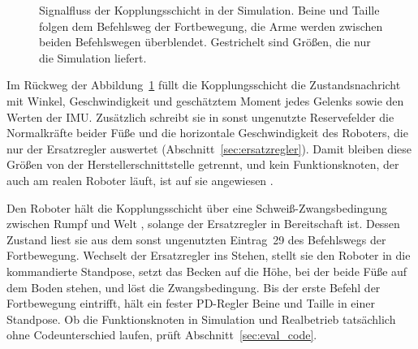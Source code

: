 \begin{figure}[htbp]
  \centering
  
  \caption[Signalfluss der Kopplungsschicht]{Signalfluss der Kopplungsschicht in der Simulation. Beine und Taille folgen dem Befehlsweg der Fortbewegung, die Arme werden zwischen beiden Befehlswegen überblendet. Gestrichelt sind Größen, die nur die Simulation liefert.}
  \label{fig:bridge}
\end{figure}

Im Rückweg der Abbildung~\ref{fig:bridge} füllt die Kopplungsschicht die Zustandsnachricht mit Winkel, Geschwindigkeit und geschätztem Moment jedes Gelenks sowie den Werten der IMU.
Zusätzlich schreibt sie in sonst ungenutzte Reservefelder die Normalkräfte beider Füße und die horizontale Geschwindigkeit des Roboters, die nur der Ersatzregler auswertet (Abschnitt~\ref{sec:ersatzregler}).
Damit bleiben diese Größen von der Herstellerschnittstelle getrennt, und kein Funktionsknoten, der auch am realen Roboter läuft, ist auf sie angewiesen .

Den Roboter hält die Kopplungsschicht über eine Schweiß-Zwangsbedingung zwischen Rumpf und Welt \cite{MujocoDoku2026}, solange der Ersatzregler in Bereitschaft ist.
Dessen Zustand liest sie aus dem sonst ungenutzten Eintrag~29 des Befehlswegs der Fortbewegung.
Wechselt der Ersatzregler ins Stehen, stellt sie den Roboter in die kommandierte Standpose, setzt das Becken auf die Höhe, bei der beide Füße auf dem Boden stehen, und löst die Zwangsbedingung.
Bis der erste Befehl der Fortbewegung eintrifft, hält ein fester PD-Regler Beine und Taille in einer Standpose.
Ob die Funktionsknoten in Simulation und Realbetrieb tatsächlich ohne Codeunterschied laufen, prüft Abschnitt~\ref{sec:eval_code}.


